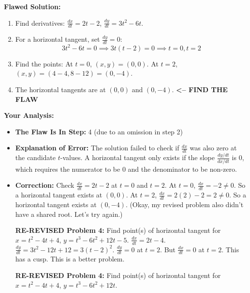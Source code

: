 \documentclass{article}
\begin{document}
\begin{itemize}
\textbf{Flawed Solution:}
\begin{enumerate}
    \item Find derivatives: $\frac{dx}{dt} = 2t-2$, $\frac{dy}{dt} = 3t^2-6t$.
    \item For a horizontal tangent, set $\frac{dy}{dt} = 0$:
    \[ 3t^2 - 6t = 0 \implies 3t(t-2)=0 \implies t = 0, t = 2 \]
    \item Find the points:
    At $t=0$, $(x,y) = (0, 0)$.
    At $t=2$, $(x,y) = (4-4, 8-12) = (0, -4)$.
    \item The horizontal tangents are at $(0, 0)$ and $(0, -4)$. \quad \longleftarrow \textbf{<-- FIND THE FLAW}
\end{enumerate}
\textbf{Your Analysis:}
\begin{itemize}
    \item \textbf{The Flaw Is In Step:} 4 (due to an omission in step 2)
    \item \textbf{Explanation of Error:} The solution failed to check if $\frac{dx}{dt}$ was also zero at the candidate $t$-values. A horizontal tangent only exists if the slope $\frac{dy/dt}{dx/dt}$ is 0, which requires the numerator to be 0 and the denominator to be non-zero.
    \item \textbf{Correction:}
    Check $\frac{dx}{dt} = 2t-2$ at $t=0$ and $t=2$.
    At $t=0$, $\frac{dx}{dt} = -2 \neq 0$. So a horizontal tangent exists at $(0,0)$.
    At $t=2$, $\frac{dx}{dt} = 2(2)-2 = 2 \neq 0$. So a horizontal tangent exists at $(0, -4)$.
    (Okay, my revised problem also didn't have a shared root. Let's try again.)

\textbf{RE-REVISED Problem 4:} Find point(s) of horizontal tangent for $x=t^2-4t+4$, $y=t^3-6t^2+12t-5$.
$\frac{dx}{dt}=2t-4$. $\frac{dy}{dt}=3t^2-12t+12=3(t-2)^2$.
$\frac{dy}{dt}=0$ at $t=2$. But $\frac{dx}{dt}=0$ at $t=2$. This has a cusp.
This is a better problem.

\textbf{RE-REVISED Problem 4:} Find point(s) of horizontal tangent for $x=t^2-4t+4$, $y=t^3-6t^2+12t$.


\end{itemize}
\end{itemize}
\end{document}
